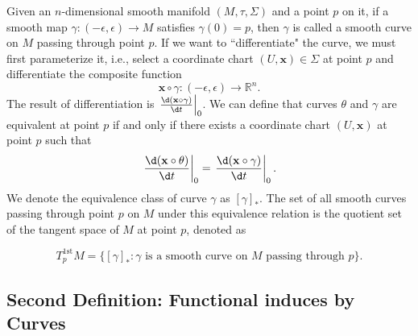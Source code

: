 \documentclass{report}
\begin{document}
Given an $n$-dimensional smooth manifold $(M,\tau,\Sigma)$ and a point $p$ on it, if a smooth map $\gamma:(-\epsilon,\epsilon)\to M$ satisfies $\gamma(0)=p$, then $\gamma$ is called a smooth curve on $M$ passing through point $p$. If we want to ``differentiate" the curve, we must first parameterize it, i.e., select a coordinate chart $(U,\mathbf{x})\in\Sigma$ at point $p$ and differentiate the composite function
\[
    \mathbf{x} \circ \gamma:(-\epsilon,\epsilon)\longrightarrow\mathbb{R}^n.
\]
The result of differentiation is $\left.\frac{\d(\mathbf{x} \circ \gamma)}{\d t}\right|_0$. 
We can define that curves $\theta$ and $\gamma$ are equivalent at point $p$ if and only if there exists a coordinate chart $(U,\mathbf{x})$ at point $p$ such that
\[
    \left.\frac{\d(\mathbf{x} \circ \theta)}{\d t}\right|_0=\left.\frac{\d(\mathbf{x} \circ \gamma)}{\d t}\right|_0.
\]
We denote the equivalence class of curve $\gamma$ as $[\gamma]_*$. The set of all smooth curves passing through point $p$ on $M$ under this equivalence relation is the quotient set of the tangent space of $M$ at point $p$, denoted as

\[
    T_p^{1\mathrm{st}}M = \{[\gamma]_*: \gamma \text{ is a smooth curve on } M \text{ passing through } p\}.
\]

\subsection{Second Definition: Functional induces by Curves}
\end{document}
